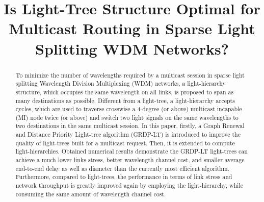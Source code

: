 \documentclass[conference]{IEEEtran}
\begin{document}
\title{Is Light-Tree Structure Optimal for Multicast Routing in Sparse Light Splitting WDM Networks?
}




\author{
\and
{}
}















\maketitle


\begin{abstract}
To minimize the number of wavelengths required by a multicast session in sparse light splitting Wavelength Division Multiplexing (WDM) networks, a light-hierarchy structure, which occupies the same wavelength on all links, is proposed to span as many destinations as possible. Different from a light-tree, a light-hierarchy accepts cycles, which are used to traverse crosswise a 4-degree (or above) multicast incapable (MI) node twice (or above) and switch two light signals on the same wavelengths to two destinations in the same multicast session. In this paper, firstly, a Graph Renewal and Distance Priority Light-tree algorithm (GRDP-LT) is introduced to improve the quality of light-trees built for a multicast request. Then, it is extended to compute light-hierarchies. Obtained numerical results demonstrate the GRDP-LT light-trees can achieve a much lower links stress, better wavelength channel cost, and smaller average end-to-end delay as well as diameter than the currently most efficient algorithm. Furthermore, compared to light-trees, the performance in terms of link stress and network throughput is greatly improved again by employing the light-hierarchy, while consuming the same amount of wavelength channel cost.\\
\end{abstract}
\end{document}
